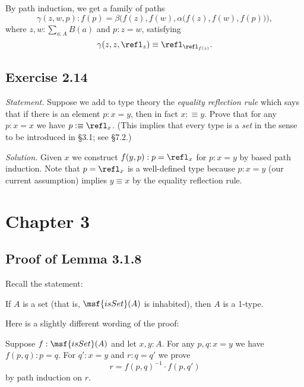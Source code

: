 \documentclass[12pt]{article}
\begin{document}
By path induction, we get a family of paths 
$$
\gamma(z,w,p):f(p)=\beta\Big(f(z),f(w),\alpha\big(f(z),f(w),f(p)\big)\Big),
$$ 
where $z,w:\sum_{a:A}B(a)$ and $p:z=w$, satisfying 
$$
\gamma(z,z,\refl_z)\equiv\refl_{\refl_{f(z)}}.
$$


\subsection{Exercise 2.14}

\emph{Statement.} Suppose we add to type theory the \emph{equality reflection rule} which says that if there is an element $p:x=y$, then in fact $x:\equiv y$. Prove that for any $p:x=x$ we have $p:\equiv\refl_x$. (This implies that every type is a \emph{set} in the sense to be introduced in \S3.1; see \S7.2.)

\nn\emph{Solution.} Given $x$ we construct $f(y,p):p=\refl_x$ for $p:x=y$ by based path induction. Note that $p=\refl_x$ is a well-defined type because $p:x=y$ (our current assumption) implies $y\equiv x$ by the equality reflection rule.


\section{Chapter 3}

\subsection{Proof of Lemma 3.1.8}\label{318}

Recall the statement: 

If $A$ is a set (that is, $\msf{isSet}(A)$ is inhabited), then $A$ is a 1-type. 

Here is a slightly different wording of the proof:

Suppose $f:\msf{isSet}(A)$ and let $x,y:A$. For any $p,q:x=y$ we have $f(p,q):p=q$. For $q':x=y$ and $r:q=q'$ we prove 
$$
r=f(p,q)^{-1}\cdot f(p,q')
$$ 
by path induction on $r$.



\end{document}
